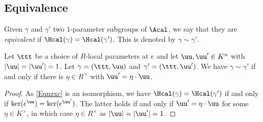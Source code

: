 \subsection{Equivalence} Given $\gamma$ and $\gamma'$ two $1$-parameter subgroups  of $\Acal$, we say that they are \emph{equivalent} if $\Hcal(\gamma)=\Hcal(\gamma')$. This is denoted by $\gamma\sim\gamma'$.

\begin{lemma}
\notready \label{LemmaVaryu1PS} Let $\ttt$ be a choice of $R$-local parameters at $e$ and let $\uu,\uu'\in K^n$ with $|\uu|=|\uu'|=1$. Let $\gamma=(\ttt,\uu)$ and $\gamma'=(\ttt,\uu')$. We have $\gamma\sim \gamma'$ if and only if there is $\eta\in R^\times$ with $\uu'=\eta\cdot \uu$.
\end{lemma}
\begin{proof} As \eqref{Eqnzxc} is an isomorphism, we have $\Hcal(\gamma)=\Hcal(\gamma')$ if and only if $\ker(\epsilon^\uu)=\ker(\epsilon^{\uu'})$. The latter holds if and only if $\uu'=\eta\cdot \uu$ for some $\eta\in K^\times$, in which case  $\eta\in R^\times$ as $|\uu|=|\uu'|=1$.
\end{proof}



